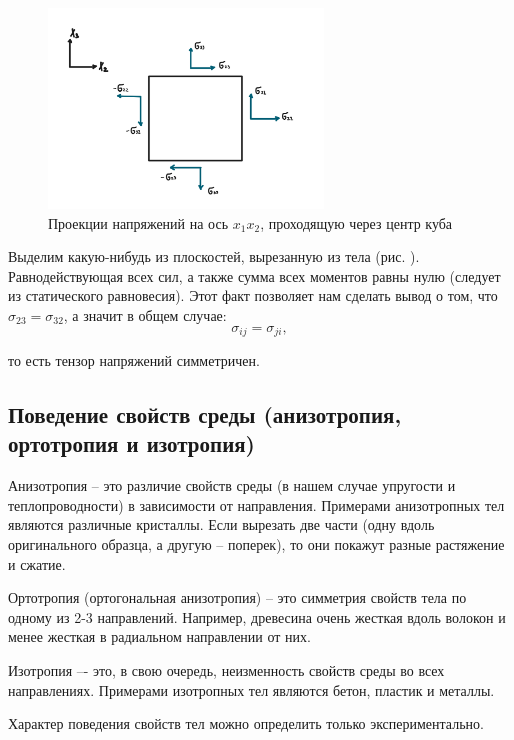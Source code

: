 \documentclass[12pt,a4paper]{article}
\begin{document}
    \begin{figure}[h]
      \centering
      \includegraphics[width=0.65\textwidth]{cube_cut.jpeg}
      \caption{Проекции напряжений на ось $x_1x_2$, проходящую через центр куба}
      \label{fig:cube_cut}
    \end{figure}

    \pagebreak

    Выделим какую-нибудь из плоскостей, вырезанную из тела (рис. ). Равнодействующая всех сил, а также сумма всех моментов равны нулю (следует из статического равновесия). Этот факт позволяет нам сделать вывод о том, что $\sigma_{23} = \sigma_{32}$, а значит в общем случае:
    \[
      \sigma_{ij} = \sigma_{ji},
    \]

    \noindent то есть тензор напряжений симметричен.

    \subsection{Поведение свойств среды (анизотропия, ортотропия и изотропия)}

    Анизотропия -- это различие свойств среды (в нашем случае упругости и теплопроводности) в зависимости от направления. Примерами анизотропных тел являются различные кристаллы. Если вырезать две части (одну вдоль оригинального образца, а другую -- поперек), то они покажут разные растяжение и сжатие. 

    Ортотропия (ортогональная анизотропия) -- это симметрия свойств тела по одному из 2-3 направлений. Например, древесина очень жесткая вдоль волокон и менее жесткая в радиальном направлении от них.

    Изотропия –- это, в свою очередь, неизменность свойств среды во всех направлениях. Примерами изотропных тел являются бетон, пластик и металлы. 
    
    Характер поведения свойств тел можно определить только экспериментально.
\end{document}
